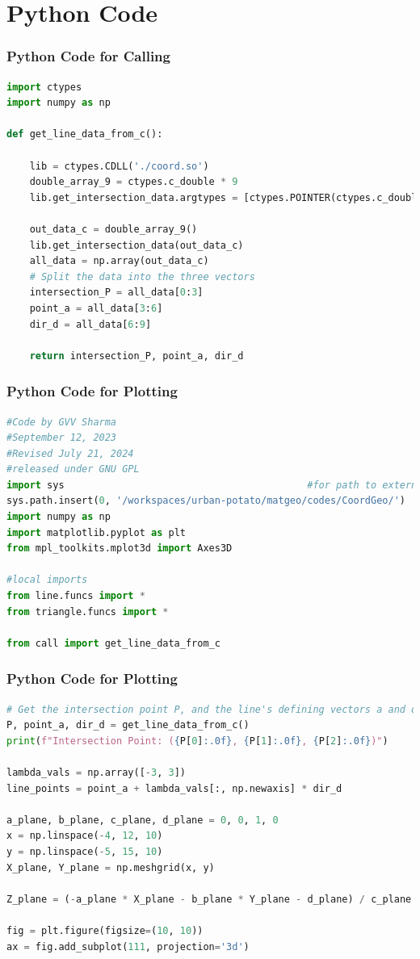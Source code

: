 \documentclass{beamer}
\theoremstyle{remark}
\numberwithin{equation}{section}
\begin{document}
\section{Python Code}
\begin{frame}[fragile]
\frametitle{Python Code for Calling}
\begin{lstlisting}[language=Python]
import ctypes
import numpy as np

def get_line_data_from_c():

    lib = ctypes.CDLL('./coord.so')
    double_array_9 = ctypes.c_double * 9
    lib.get_intersection_data.argtypes = [ctypes.POINTER(ctypes.c_double)]

    out_data_c = double_array_9()
    lib.get_intersection_data(out_data_c)
    all_data = np.array(out_data_c)
    # Split the data into the three vectors
    intersection_P = all_data[0:3]
    point_a = all_data[3:6]
    dir_d = all_data[6:9]
    
    return intersection_P, point_a, dir_d
\end{lstlisting}
\end{frame}
\begin{frame}[fragile]
\frametitle{Python Code for Plotting}
\begin{lstlisting}[language=Python]
#Code by GVV Sharma
#September 12, 2023
#Revised July 21, 2024
#released under GNU GPL
import sys                                          #for path to external scripts
sys.path.insert(0, '/workspaces/urban-potato/matgeo/codes/CoordGeo/') 
import numpy as np
import matplotlib.pyplot as plt
from mpl_toolkits.mplot3d import Axes3D

#local imports
from line.funcs import *
from triangle.funcs import *

from call import get_line_data_from_c
\end{lstlisting}
\end{frame}

\begin{frame}[fragile]
\frametitle{Python Code for Plotting}
\begin{lstlisting}[language=Python]
# Get the intersection point P, and the line's defining vectors a and d
P, point_a, dir_d = get_line_data_from_c()
print(f"Intersection Point: ({P[0]:.0f}, {P[1]:.0f}, {P[2]:.0f})")

lambda_vals = np.array([-3, 3])
line_points = point_a + lambda_vals[:, np.newaxis] * dir_d
 
a_plane, b_plane, c_plane, d_plane = 0, 0, 1, 0
x = np.linspace(-4, 12, 10)   
y = np.linspace(-5, 15, 10)   
X_plane, Y_plane = np.meshgrid(x, y)
 
Z_plane = (-a_plane * X_plane - b_plane * Y_plane - d_plane) / c_plane

fig = plt.figure(figsize=(10, 10))
ax = fig.add_subplot(111, projection='3d')

\end{lstlisting}
\end{frame}
\end{document}
